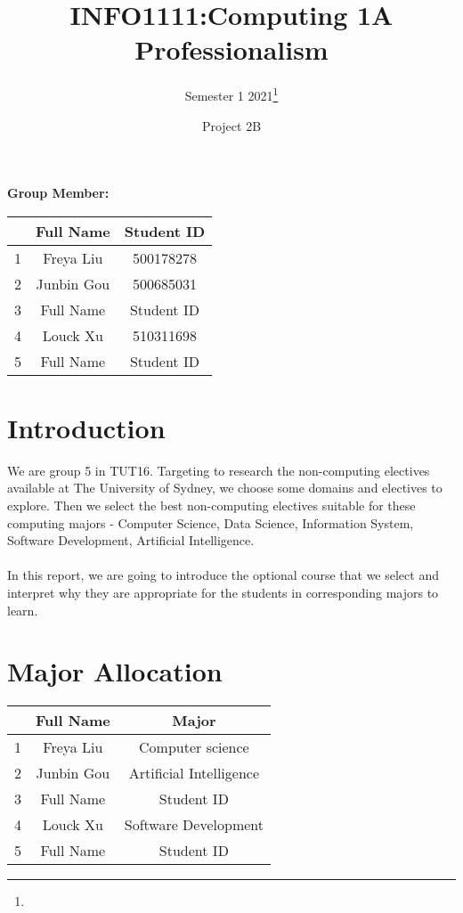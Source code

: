 \documentclass{article}
\title{INFO1111:Computing 1A Professionalism}
\author{Semester 1 2021\thanks{}}
\date{Project 2B}
\begin{document}
	
	
	\begin{titlepage}
		\maketitle
		\begin{title}
			\begin{center}
				\textbf{Group Member:}
			\end{center}
		\end{title}
		\begin{center}
			
			\begin{tabular}{|c|c|c|}
				\hline &Full Name& Student ID\\
				\hline 1& Freya Liu & 500178278  \\
				\hline 2& Junbin Gou & 500685031  \\
				\hline 3&Full Name& Student ID  \\
				\hline 4& Louck Xu & 510311698  \\
				\hline 5&Full Name& Student ID  \\
				\hline
			\end{tabular}
		\end{center}
	\end{titlepage}
	
	\section{Introduction}
	We are group 5 in TUT16. Targeting to research the non-computing electives available at The University of Sydney, we choose some domains and electives to explore. Then we select the best non-computing electives suitable for these computing majors - Computer Science, Data Science, Information System, Software Development, Artificial Intelligence. \\
	\\
	In this report, we are going to introduce the optional course that we select and interpret why they are appropriate for the students in corresponding majors to learn.
	\section{Major Allocation}
	\begin{center}
		\begin{larger}
			\begin{tabular}{|c|c|c|}
				\hline &Full Name& Major\\
				\hline 1& Freya Liu & Computer science  \\
				\hline 2& Junbin Gou & Artificial Intelligence  \\
				\hline 3&Full Name& Student ID  \\
				\hline 4& Louck Xu & Software Development  \\
				\hline 5&Full Name& Student ID  \\
				\hline
			\end{tabular}
		\end{larger}
	\end{center}
	
\end{document}
